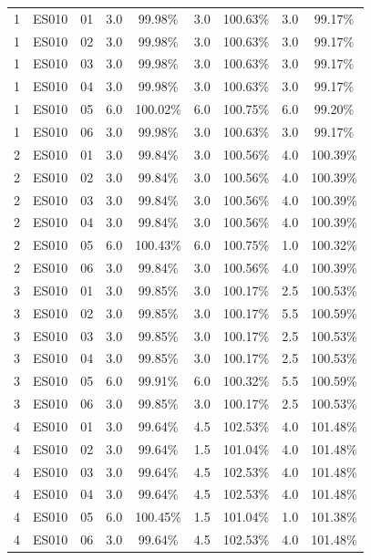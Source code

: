 \documentclass[10pt,a4paper,oneside]{article}
\begin{document}
\begin{longtable}{@{}ccccccccc@{}}
1 & ES010 & 01 & 3.0 & 99.98\% & 3.0 & 100.63\% & 3.0 & 99.17\% \\
1 & ES010 & 02 & 3.0 & 99.98\% & 3.0 & 100.63\% & 3.0 & 99.17\% \\
1 & ES010 & 03 & 3.0 & 99.98\% & 3.0 & 100.63\% & 3.0 & 99.17\% \\
1 & ES010 & 04 & 3.0 & 99.98\% & 3.0 & 100.63\% & 3.0 & 99.17\% \\
1 & ES010 & 05 & 6.0 & 100.02\% & 6.0 & 100.75\% & 6.0 & 99.20\% \\
1 & ES010 & 06 & 3.0 & 99.98\% & 3.0 & 100.63\% & 3.0 & 99.17\% \\
2 & ES010 & 01 & 3.0 & 99.84\% & 3.0 & 100.56\% & 4.0 & 100.39\% \\
2 & ES010 & 02 & 3.0 & 99.84\% & 3.0 & 100.56\% & 4.0 & 100.39\% \\
2 & ES010 & 03 & 3.0 & 99.84\% & 3.0 & 100.56\% & 4.0 & 100.39\% \\
2 & ES010 & 04 & 3.0 & 99.84\% & 3.0 & 100.56\% & 4.0 & 100.39\% \\
2 & ES010 & 05 & 6.0 & 100.43\% & 6.0 & 100.75\% & 1.0 & 100.32\% \\
2 & ES010 & 06 & 3.0 & 99.84\% & 3.0 & 100.56\% & 4.0 & 100.39\% \\
3 & ES010 & 01 & 3.0 & 99.85\% & 3.0 & 100.17\% & 2.5 & 100.53\% \\
3 & ES010 & 02 & 3.0 & 99.85\% & 3.0 & 100.17\% & 5.5 & 100.59\% \\
3 & ES010 & 03 & 3.0 & 99.85\% & 3.0 & 100.17\% & 2.5 & 100.53\% \\
3 & ES010 & 04 & 3.0 & 99.85\% & 3.0 & 100.17\% & 2.5 & 100.53\% \\
3 & ES010 & 05 & 6.0 & 99.91\% & 6.0 & 100.32\% & 5.5 & 100.59\% \\
3 & ES010 & 06 & 3.0 & 99.85\% & 3.0 & 100.17\% & 2.5 & 100.53\% \\
4 & ES010 & 01 & 3.0 & 99.64\% & 4.5 & 102.53\% & 4.0 & 101.48\% \\
4 & ES010 & 02 & 3.0 & 99.64\% & 1.5 & 101.04\% & 4.0 & 101.48\% \\
4 & ES010 & 03 & 3.0 & 99.64\% & 4.5 & 102.53\% & 4.0 & 101.48\% \\
4 & ES010 & 04 & 3.0 & 99.64\% & 4.5 & 102.53\% & 4.0 & 101.48\% \\
4 & ES010 & 05 & 6.0 & 100.45\% & 1.5 & 101.04\% & 1.0 & 101.38\% \\
4 & ES010 & 06 & 3.0 & 99.64\% & 4.5 & 102.53\% & 4.0 & 101.48\% \\

\end{longtable}
\end{document}
